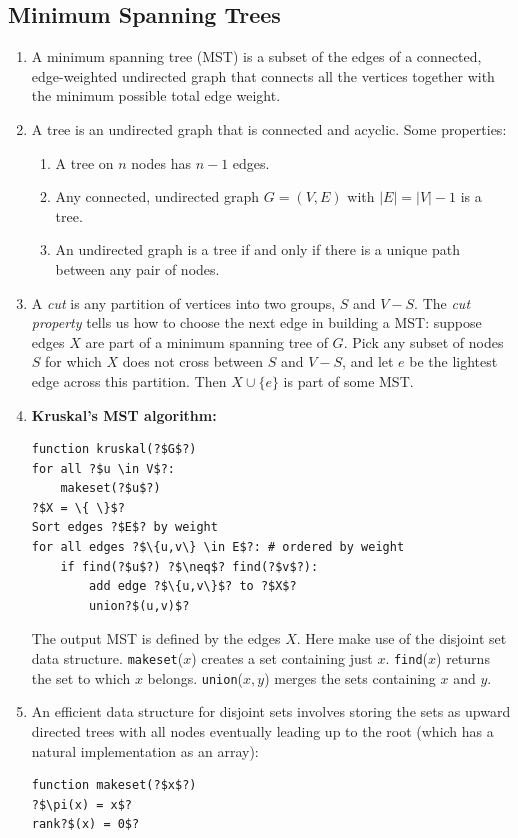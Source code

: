 \documentclass[10pt]{article}
\begin{document}
\begin{multicols}{2}
\begin{addmargin}[0.8em]{0.5em}
    \subsection{Minimum Spanning Trees}
    \begin{enumerate}[label=(\alph*)]
        \item A minimum spanning tree (MST) is a subset of the edges of a connected, edge-weighted undirected graph that connects all the vertices together with the minimum possible total edge weight.
        \item A tree is an undirected graph that is connected and acyclic. Some properties:
        \begin{enumerate}[label=(\roman*)]
        \item A tree on $n$ nodes has $n - 1$ edges.
        \item Any connected, undirected graph $G = (V, E)$ with $|E| = |V | - 1$ is a tree.
        \item An undirected graph is a tree if and only if there is a unique path between any pair of nodes.
        \end{enumerate}
        \item A \textit{cut} is any partition of vertices into two groups, $S$ and $V - S$. The \textit{cut property} tells us how to choose the next edge in building a MST: suppose edges $X$ are part of a minimum spanning tree of $G$. Pick any subset of nodes $S$ for which $X$ does not cross between $S$ and $V - S$, and let $e$ be the lightest edge across this partition. Then $X \cup \{e\}$ is part of some MST.
        \item \textbf{Kruskal’s MST algorithm:}
\begin{verbatim}
function kruskal(?$G$?)
for all ?$u \in V$?:
    makeset(?$u$?)
?$X = \{ \}$?
Sort edges ?$E$? by weight
for all edges ?$\{u,v\} \in E$?: # ordered by weight
    if find(?$u$?) ?$\neq$? find(?$v$?):
        add edge ?$\{u,v\}$? to ?$X$?
        union?$(u,v)$?
\end{verbatim}
        The output MST is defined by the edges $X$. Here make use of the disjoint set data structure. \texttt{makeset}($x$) creates a set containing just $x$. \texttt{find}($x$) returns the set to which $x$ belongs. \texttt{union}($x, y$) merges the sets containing $x$ and $y$.
        \item An efficient data structure for disjoint sets involves storing the sets as upward directed trees with all nodes eventually leading up to the root (which has a natural implementation as an array):
\begin{verbatim}
function makeset(?$x$?)
?$\pi(x) = x$?
rank?$(x) = 0$?


\end{verbatim}
\end{enumerate}
\end{addmargin}
\end{multicols}
\end{document}
